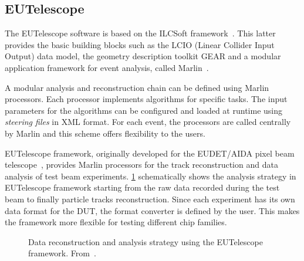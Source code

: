 \subsection{EUTelescope}
\label{sec:EUTelescope}
The EUTelescope software is based on the ILCSoft
framework~\cite{Aplin:2009zz}. This latter provides the basic building
blocks such as the LCIO (Linear Collider Input Output) data model, the
geometry description toolkit GEAR and a modular application framework
for event analysis, called Marlin~\cite{Gaede:2006pj}.

A modular analysis and reconstruction chain can be defined using
Marlin processors. Each processor implements algorithms for specific
tasks. The input parameters for the algorithms can be configured and
loaded at runtime using \textit{steering files} in XML format. For
each event, the processors are called centrally by Marlin and this
scheme offers flexibility to the users.

EUTelescope framework, originally developed for the EUDET/AIDA pixel
beam telescope~\cite{Rubinskiy:2014kza}, provides Marlin processors
for the track reconstruction and data analysis of test beam
experiments. \cref{fig:EUTelescope_EUDET_pipeline} schematically shows
the analysis strategy in EUTelescope framework starting from the raw
data recorded during the test beam to finally particle tracks
reconstruction. Since each experiment has its own data format for the
DUT, the format converter is defined by the user. This makes the
framework more flexible for testing different chip families.

\begin{figure}[htbp]
  \centering
  \caption{Data reconstruction and analysis strategy using the
    EUTelescope framework. From~\cite{Jansen:2016bkd}.}
  \label{fig:EUTelescope_EUDET_pipeline}
\end{figure}

